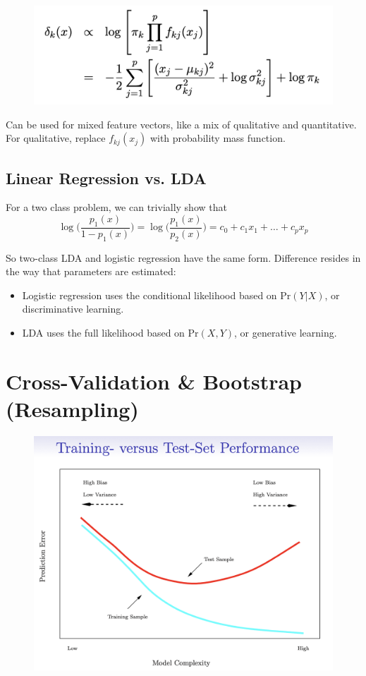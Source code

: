 \documentclass{article}
\begin{document}
\begin{figure}[h!]
    \centering
    \includegraphics[width=0.75\linewidth]{Naive_bayes.png}
\end{figure}

Can be used for mixed feature vectors, like a mix of qualitative and quantitative. For qualitative, replace $f_{kj}(x_j)$ with probability mass function.

\subsection{Linear Regression vs. LDA}

For a two class problem, we can trivially show that $$
\log\Big(\frac{p_1(x)}{1 - p_1(x)}\Big) = \log\Big(\frac{p_1(x)}{p_2(x)}\Big) = c_0 + c_1 x_1 + \dots + c_p x_p$$

So two-class LDA and logistic regression have the same form. Difference resides in the way that parameters are estimated:

\begin{itemize}
    \item Logistic regression uses the conditional likelihood based on $\mathrm{Pr}(Y \vert X)$, or discriminative learning.
    \item LDA uses the full likelihood based on $\mathrm{Pr}(X, Y)$, or generative learning.
    
\end{itemize}

\section{Cross-Validation \& Bootstrap (Resampling)}

\begin{figure}[h!]
    \centering
    \includegraphics[width=0.5\linewidth]{Error_vs_complexity.png}
\end{figure}
\end{document}
